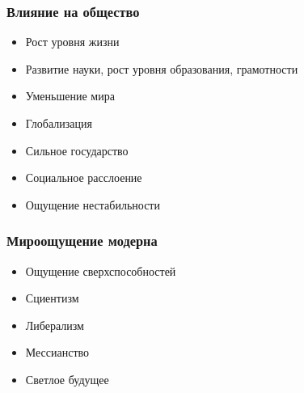\documentclass[aspectratio=169]{beamer}
\begin{document}
\begin{bframe}\frametitle{Влияние на общество}
\begin{itemize}
\item<+-> Рост уровня жизни
\item<+-> Развитие науки, рост уровня образования, грамотности
\item<+-> Уменьшение мира
\item<+-> Глобализация
\item<+-> Сильное государство
\item<+-> Социальное расслоение
\item<+-> Ощущение нестабильности
\end{itemize}
\end{bframe}

\begin{bframe}\frametitle{Мироощущение модерна}
\begin{itemize}
\item<+-> Ощущение сверхспособностей
\item<+-> Сциентизм
\item<+-> Либерализм
\item<+-> Мессианство
\item<+-> Светлое будущее
\end{itemize}
\end{bframe}
\end{document}
